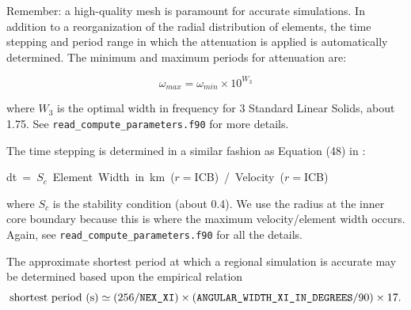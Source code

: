 Remember: a high-quality mesh is paramount for accurate simulations.
In addition to a reorganization of the radial distribution of elements,
the time stepping and period range in which the attenuation is applied
is automatically determined. The minimum and maximum periods for attenuation
are:

\[
\omega_{max}=\omega_{min}\times10^{W_{3}}\]


\noindent where $W_{3}$ is the optimal width in frequency for 3 Standard
Linear Solids, about 1.75. See \texttt{\small read\_compute\_parameters.f90}
for more details.

The time stepping is determined in a similar fashion as Equation (48)
in \citet{KoTr02a}:

\begin{lyxcode}
dt~=~$S_{c}$~Element~Width~in~km~($r=$ICB)~/~Velocity~($r=$ICB)
\end{lyxcode}
where $S_{c}$ is the stability condition (about 0.4). We use the
radius at the inner core boundary because this is where the maximum
velocity/element width occurs. Again, see \texttt{\small read\_compute\_parameters}\texttt{.f90}
for all the details.

The approximate shortest period at which a regional simulation is
accurate may be determined based upon the empirical relation
\begin{equation}
\mbox{shortest period (s)}\simeq(256/\mbox{\texttt{NEX\_XI}})\times(\texttt{ANGULAR\_WIDTH\_XI\_IN\_DEGREES}/90)\times17.\label{eq:shortest_period_regional}\end{equation}



